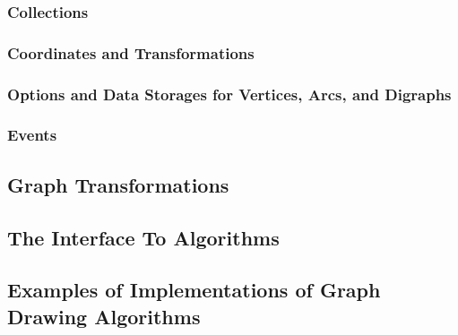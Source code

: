 
\subsubsection{Collections}


\subsubsection{Coordinates and Transformations}


\subsubsection{Options and Data Storages for Vertices, Arcs, and Digraphs}


\subsubsection{Events}





\subsection{Graph Transformations}

\label{section-gd-transformations}




\subsection{The Interface To Algorithms}

\label{section-gd-interface-to-algorithms}






\subsection{Examples of Implementations of Graph Drawing Algorithms}
\label{section-gd-examples}

